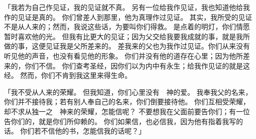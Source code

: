 {\par }{\PP {}「我若为自己作见证，我的见证就不真。
另有一位给我作见证，我也知道他给我作的见证是真的。
你们曾差人到{}那里，他为真理作过见证。
其实，我所受的见证不是从人来的；然而，我说这些话，为要叫你们得救。
是点着的明灯，你们情愿暂时喜欢他的光。
但我有比{}更大的见证；因为父交给我要我成就的事，就是我所做的事，这便见证我是父所差来的。
差我来的父也为我作过见证。你们从来没有听见他的声音，也没有看见他的形象。
你们并没有他的道存在心里；因为他所差来的，你们不信。
你们查考圣经，因你们以为内中有永生；给我作见证的就是这经。
然而，你们不肯到我这里来得生命。
\par }{\PP {}「我不受从人来的荣耀。
但我知道，你们心里没有　神的爱。
我奉我父的名来，你们并不接待我；若有别人奉自己的名来，你们倒要接待他。
你们互相受荣耀，却不求从独一之　神来的荣耀，怎能信{}呢？
不要想我在父面前要告你们；有一位告你们的，就是你们所仰赖的{}。
你们如果信{}，也必信我，因为他{}有指着我写的话。
你们若不信他的书，怎能信我的话呢？」

}
